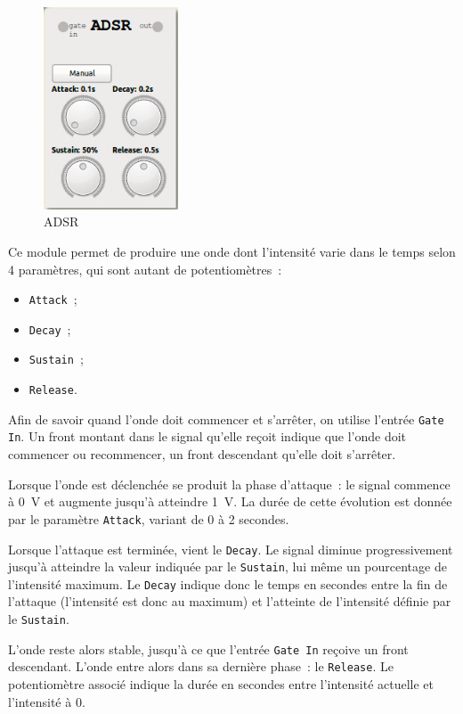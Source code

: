 \documentclass[a4paper,oneside,frenchb,10pt]{article}
\begin{document}
\begin{multicols}{2}
\begin{figure}[H]
\centering
\includegraphics[width=4cm]{../img/png/adsr.png}
\caption{ADSR}
\end{figure}

Ce module permet de produire une onde dont l'intensité varie dans le
temps selon 4 paramètres, qui sont autant de potentiomètres~:

\begin{itemize}
\item
  \verb!Attack!~;
\item
  \verb!Decay!~;
\item
  \verb!Sustain!~;
\item
  \verb!Release!.
\end{itemize}

Afin de savoir quand l'onde doit commencer et s'arrêter, on utilise
l'entrée \verb!Gate In!. Un front montant dans le signal qu'elle reçoit
indique que l'onde doit commencer ou recommencer, un front descendant
qu'elle doit s'arrêter.

Lorsque l'onde est déclenchée se produit la phase d'attaque~: le signal
commence à 0~V et augmente jusqu'à atteindre 1~V. La durée de cette
évolution est donnée par le paramètre \verb!Attack!, variant de 0 à 2
secondes.
\end{multicols}

Lorsque l'attaque est terminée, vient le \verb!Decay!. Le signal diminue
progressivement jusqu'à atteindre la valeur indiquée par le
\verb!Sustain!, lui même un pourcentage de l'intensité maximum. Le
\verb!Decay! indique donc le temps en secondes entre la fin de l'attaque
(l'intensité est donc au maximum) et l'atteinte de l'intensité définie
par le \verb!Sustain!.

L'onde reste alors stable, jusqu'à ce que l'entrée \verb!Gate In!
reçoive un front descendant. L'onde entre alors dans sa dernière phase~:
le \verb!Release!. Le potentiomètre associé indique la durée en secondes
entre l'intensité actuelle et l'intensité à 0.
\end{document}
